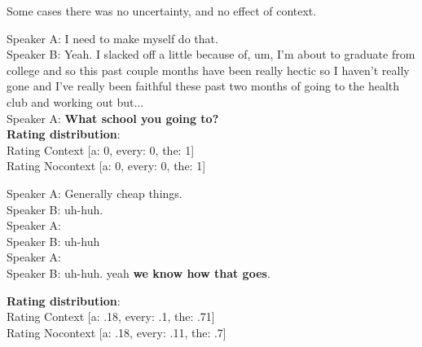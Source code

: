 \documentclass[12pt,letterpaper,table,svgnames,dvipsnames]{article}
\begin{document}
Some cases there was no uncertainty, and no effect of context.
\begin{exe}
\ex {}
    \begin{xlist}
    \ex {}
    Speaker A: I need to make myself do that.\\
    Speaker B: Yeah. I slacked off a little because of, um, I'm about to graduate from college and so this past couple months have been really hectic so I haven't really gone and I've really been faithful these past two months of going to the health club and working out but...\\
    Speaker A: \textbf{What school you going to?}\\
    
    \ex \textbf{Rating distribution}:\\
    Rating Context [a: 0, every: 0, the: 1]\\
    Rating Nocontext [a: 0, every: 0, the: 1]
    \end{xlist}
\end{exe}



\begin{exe}
\ex {}
    \begin{xlist}
    \ex {}
    Speaker A: Generally cheap things.\\
    Speaker B: uh-huh.\\
    Speaker A: \\
    Speaker B: uh-huh\\
    Speaker A: \\
    Speaker B: uh-huh. yeah \textbf{we know how that goes}.
    
    \ex \textbf{Rating distribution}:\\
    Rating Context [a: .18, every: .1, the: .71]\\
    Rating Nocontext [a: .18, every: .11, the: .7]
    \end{xlist}
\end{exe}


\end{document}
